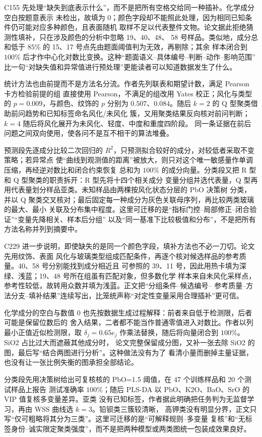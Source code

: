 C155 先处理“缺失到底表示什么”，而不是把所有空格交给同一种插补。化学成分空白按题意表示
未检出，故填为 0；颜色字段却不能照此处理，因为相同已知条件仍可能对应多种颜色，且表面随机
取样不足以代表整件文物。论文据此拒绝猜测性填补，只在涉及颜色的分析中忽略 19、40、48、
58 号样品。类似地，成分总和低于 $85\%$ 的 15、17 号点先由题面阈值判为无效，再剔除；其余
样本闭合到 $100\%$ 后才作中心化对数比变换。这种“题面语义--具体编号--判断--动作--影响范围”
比一句“对缺失值和异常值进行预处理”更能读者可以知道数据发生了什么。

统计方法也由前提而不是方法名分流。作者先列联表和期望计数，满足 Pearson 卡方检验前提的组
直接使用 Pearson，不满足的组改用 Yates 校正；风化与类型的 $p=0.009$，与颜色、纹饰的
$p$ 分别为 $0.507$、$0.084$。随后 $k=2$ 的 Q 型聚类借助前问趋势和已知标签命名风化/未风化
簇，又用聚类结果反向核对前问判断；$k=4$ 随后将风化展开为未风化、轻度、中度和重度四阶段。
同一条证据在前后问题之间双向使用，使各问不是互不相干的算法堆叠。

预测段先逐成分比较二次回归的 $R^2$，只预测拟合较好的成分，对较低者采取不变策略；若异常点
使“曲线到观测值的距离”被放大，则只对这个唯一敏感量作单调压缩，再经逆对数比和闭合约束恢复
总和为 $100\%$ 的成分向量。分类段又把 R 型和 Q 型聚类的职责拆开：R 型先将十四个相关成分
变量分组并选代表量，Q 型再用代表量划分样品亚类。未知样品由两棵按风化状态分层的 PbO 决策树
分类，并以 Q 聚类交叉核对；最后固定每一种成分为灰色关联母序列，再比较两类玻璃的最大、最小
关联及分布集中程度。这里可迁移的是“指标门控--局部修正--闭合验证”“变量先降相关、样本后分组”
以及“同一基准下比较极值和分布”，不是把所有方法名称并列到摘要中。

C229 进一步说明，即使缺失的是同一个颜色字段，填补方法也不必一刀切。论文先用纹饰、表面
风化与玻璃类型组成匹配条件，再逐个核对候选样品的参考质量。40、58 号分别能找到成分相近且
可参照的 39、11 号，因此用热卡填为深绿、浅蓝；19、48 号所在组虽有匹配对象，但多数化学
样本来自未风化采样点，参考性较低，故转用众数并填为浅蓝。正文把“分组条件--候选编号--
参考质量--方法分支--填补结果”连续写出，比笼统声称“对定性变量采用合理插补”更可信。

化学成分的空白与数值 0 也先按数据生成过程解释：前者来自低于检测限，后者可能是保留位数后的
舍入结果，二者都不能当作普通零值进入对数比。作者以列最小正值近似检测限，取
$\delta_j=0.65e_j$ 作乘法替换，随后将向量闭合到 $100\%$。SiO2 占比过大而遮蔽其他成分时，
论文完整保留成分图，又补一张去除 SiO2 的图，最后写“结合两图进行分析”。这种做法没有为了
看清小量而删掉主量证据，也没有让一张比例失衡的图承担全部结论。

分类段先用决策树给出可复核核的 PbO=1.5 阈值，在 47 个训练样品和 20 个测试样品上报告
测试准确率 $100\%$；随后 PLS-DA 以 PbO、K2O、BaO、SrO 的 VIP 值复核多变量差异。亚类
没有已知标签，作者据此明确把任务判为无监督学习，再由 WSS 曲线选 $k=3$。铅钡类三簇较清晰，
高钾类没有明显分界，正文只写“仅可粗略将其分为三类”。这里可迁移的是“可解释规则--多变量
复核”和“无标签身份--诚实限定聚类强度”，而不是把两种模型或两类图统一包装成效果良好。

